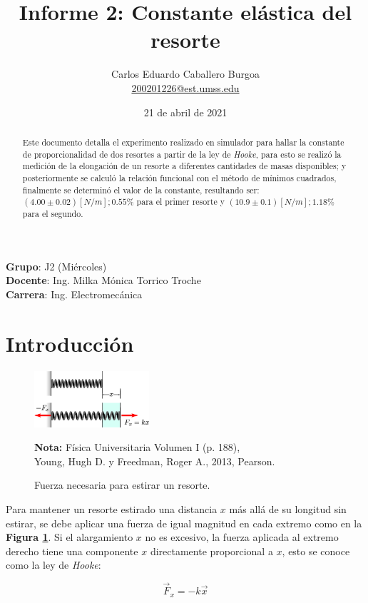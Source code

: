 \documentclass[letter,11pt]{article}
\title{Informe 2: Constante elástica del resorte}
\author{Carlos Eduardo Caballero Burgoa \\
    \small{\href{mailto:200201226@est.umss.edu}{200201226@est.umss.edu}}
}
\date{21 de abril de 2021}
\newcommand{\source}[1]{\vspace{-11pt} \caption*{\small{\textbf{Nota:} {#1}}}}
\begin{document}
\maketitle
\begin{center}
    \textbf{Grupo}: J2 (Miércoles)\\
    \textbf{Docente}: Ing. Milka Mónica Torrico Troche\\
    \textbf{Carrera}: Ing. Electromecánica
\end{center}

\begin{abstract}
Este documento detalla el experimento realizado en simulador para hallar la
constante de proporcionalidad de dos resortes a partir de la ley de
\emph{Hooke}, para esto se realizó la medición de la elongación de un resorte a
diferentes cantidades de masas disponibles; y posteriormente se calculó la 
relación funcional con el método de mínimos cuadrados, finalmente se determinó
el valor de la constante, resultando ser: $(4.00 \pm 0.02)[N/m]; 0.55\%$ para el
primer resorte y $(10.9 \pm 0.1)[N/m]; 1.18\%$ para el segundo.
\end{abstract}

\section{Introducción}

\begin{figure}
\centering
\includegraphics[width=0.38\textwidth]{resources/f1.eps}
\caption{Fuerza necesaria para estirar un resorte.}
\label{figura1}
\source{Física Universitaria Volumen I (p. 188), \\
Young, Hugh D. y Freedman, Roger A., 2013, Pearson.}
\end{figure}

Para mantener un resorte estirado una distancia $x$ más allá de su longitud sin
estirar, se debe aplicar una fuerza de igual magnitud en cada extremo como en la
\textbf{Figura \ref{figura1}}. Si el alargamiento $x$ no es excesivo, la fuerza
aplicada al extremo derecho tiene una componente $x$ directamente proporcional
a $x$, esto se conoce como la ley de \emph{Hooke}:

\begin{equation}
    \vec{F}_x = - k \vec{x}
\label{hooke}
\end{equation}
\vspace{0.10cm}
\end{document}
